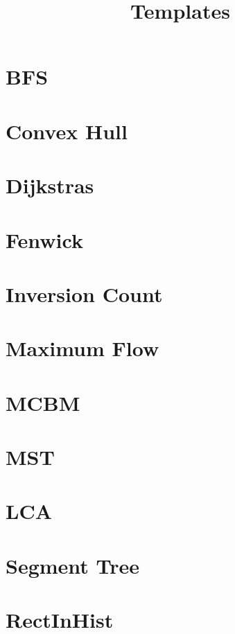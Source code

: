 \documentclass[twocolumn]{article}
\begin{document}
    \title{Templates}
    {\tiny
    \section{BFS}
    
    \section{Convex Hull}
    
    \section{Dijkstras}
    

    \newpage

    \section{Fenwick}
    
    \section{Inversion Count}
    
    \section{Maximum Flow}
    
    \section{MCBM}
    
    \section{MST}
    

    \newpage

    \section{LCA}
    
    \section{Segment Tree}
    

    \newpage

    \section{RectInHist}
    
}
\end{document}
